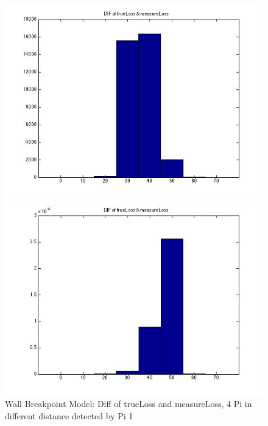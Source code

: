 \documentclass[10pt,conference]{IEEEtran}
\begin{document}
\begin{figure}[htbp]
\begin{minipage}[t]{0.2\textwidth}
	\includegraphics[scale=0.2]{wallbreakpoint0-3}
\end{minipage}
\begin{minipage}[t]{0.2\textwidth}
	\centering
	\includegraphics[scale=0.2]{wallbreakpoint0-4}
\end{minipage}
\caption{Wall Breakpoint Model: Diff of trueLoss and measureLoss, 4 Pi in different distance detected by Pi 1}\label{wallbreakpoint}
\end{figure}

\end{document}
